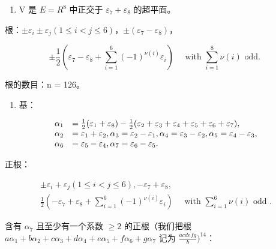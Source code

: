 
\begin{enumerate}
\def\labelenumi{(\Roman{enumi})}
\tightlist
\item
  V 是 \(E = R^{8}\) 中正交于 \(\varepsilon_{7} + \varepsilon_{8}\) 的超平面。
\end{enumerate}

根：\(\pm \varepsilon_{i} \pm \varepsilon_{j} (1 \leqslant i < j \leqslant 6)\)，\(\pm (\varepsilon_{7} - \varepsilon_{8})\)，

\[
\pm \frac {1}{2} (\varepsilon_ {7} - \varepsilon_ {8} + \sum_ {i = 1} ^ {6} (- 1) ^ {\nu (i)} \varepsilon_ {i}) \quad \text { with } \sum_ {i = 1} ^ {8} \nu (i) \text { odd. }
\]

根的数目：n = 126。

\begin{enumerate}
\def\labelenumi{(\Roman{enumi})}
\setcounter{enumi}{1}
\tightlist
\item
  基：
\end{enumerate}

\[
\begin{array}{r l} \alpha_ {1} & = \frac {1}{2} (\varepsilon_ {1} + \varepsilon_ {8}) - \frac {1}{2} (\varepsilon_ {2} + \varepsilon_ {3} + \varepsilon_ {4} + \varepsilon_ {5} + \varepsilon_ {6} + \varepsilon_ {7}), \\ \alpha_ {2} & = \varepsilon_ {1} + \varepsilon_ {2}, \alpha_ {3} = \varepsilon_ {2} - \varepsilon_ {1}, \alpha_ {4} = \varepsilon_ {3} - \varepsilon_ {2}, \alpha_ {5} = \varepsilon_ {4} - \varepsilon_ {3}, \\ \alpha_ {6} & = \varepsilon_ {5} - \varepsilon_ {4}, \alpha_ {7} = \varepsilon_ {6} - \varepsilon_ {5}. \end{array}
\]

正根：

\[
\begin{array}{c} \pm \varepsilon_ {i} + \varepsilon_ {j} (1 \leqslant i <   j \leqslant 6), - \varepsilon_ {7} + \varepsilon_ {8}, \\ \frac {1}{2} (- \varepsilon_ {7} + \varepsilon_ {8} + \sum_ {i = 1} ^ {6} (- 1) ^ {\nu (i)} \varepsilon_ {i}) \quad \text { with } \sum_ {i = 1} ^ {6} \nu (i) \text { odd }. \end{array}
\]

含有 \(\alpha_{7}\) 且至少有一个系数 \(\geqslant 2\) 的正根（我们把根 \(a\alpha_{1} + b\alpha_{2} + c\alpha_{3} + d\alpha_{4} + e\alpha_{5} + f\alpha_{6} + g\alpha_{7}\) 记为 \(\frac{a c d e f g}{b})^{14}\)：

